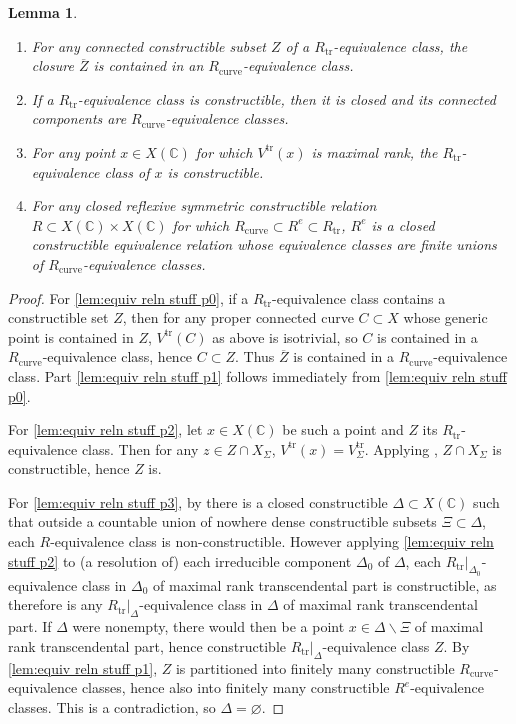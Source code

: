 \documentclass{amsart}
\newcommand{\bs}{\backslash}
\newcommand{\ol}{\overline}
\newtheorem{lem}[theorem]{Lemma}
\theoremstyle{definition}
\theoremstyle{remark}
\def\bC{\mathbb{C}}
\def\trans{\mathrm{tr}}
\renewcommand{\bar}[1]{\ol{#1}}
\numberwithin{equation}{section}
\begin{document}
\begin{lem}\label{lem:equiv reln stuff}\hspace{.5in}
\begin{enumerate}
\item\label{lem:equiv reln stuff p0} For any connected constructible subset $Z$ of a $R_\trans$-equivalence class, the closure $\bar Z$ is contained in an $R_\mathrm{curve}$-equivalence class.  
\item\label{lem:equiv reln stuff p1} If a $R_\trans$-equivalence class is constructible, then it is closed and its connected components are $R_\mathrm{curve}$-equivalence classes.  
\item\label{lem:equiv reln stuff p2} For any point $x\in X(\bC)$ for which $V^\trans(x)$ is maximal rank, the $R_\trans$-equivalence class of $x$ is constructible.
\item\label{lem:equiv reln stuff p3} For any closed reflexive symmetric constructible relation $R\subset X(\bC)\times X(\bC)$ for which $R_\mathrm{curve}\subset R^e\subset R_\trans$, $R^e$ is a closed constructible equivalence relation whose equivalence classes are finite unions of $R_\mathrm{curve}$-equivalence classes.
\end{enumerate}
\end{lem}
\begin{proof}
For \eqref{lem:equiv reln stuff p0}, if a $R_\trans$-equivalence class contains a constructible set $Z$, then for any proper connected curve $C\subset X$ whose generic point is contained in $Z$, $V^\trans(C)$ as above is isotrivial, so $C$ is contained in a $R_\mathrm{curve}$-equivalence class, hence $C\subset Z$.  Thus $\bar Z$ is contained in a $R_\mathrm{curve}$-equivalence class.  Part \eqref{lem:equiv reln stuff p1} follows immediately from \eqref{lem:equiv reln stuff p0}.



For \eqref{lem:equiv reln stuff p2}, let $x\in X(\bC)$ be such a point and $Z$ its $R_\trans$-equivalence class.  Then for any $z\in Z\cap X_\Sigma$, $V^\trans(x)=V^\trans_\Sigma$.  Applying , $Z\cap X_\Sigma$ is constructible, hence $Z$ is.

For \eqref{lem:equiv reln stuff p3}, by  there is a closed constructible $\Delta\subset X(\bC)$ such that outside a countable union of nowhere dense constructible subsets $\Xi\subset \Delta$, each $R$-equivalence class is non-constructible. However applying \eqref{lem:equiv reln stuff p2} to (a resolution of) each irreducible component $\Delta_0$ of $\Delta$, each $R_\trans|_{\Delta_0}$-equivalence class in $\Delta_0$ of maximal rank transcendental part is constructible, as therefore is any $R_\trans|_\Delta$-equivalence class in $\Delta$ of maximal rank transcendental part.  If $\Delta$ were nonempty, there would then be a point $x\in\Delta\bs \Xi$ of maximal rank transcendental part, hence constructible $R_\trans|_\Delta$-equivalence class $Z$.  By \eqref{lem:equiv reln stuff p1}, $Z$ is partitioned into finitely many constructible $R_\mathrm{curve}$-equivalence classes, hence also into finitely many constructible $R^e$-equivalence classes.  This is a contradiction, so $\Delta=\varnothing$. 
\end{proof}
\end{document}
